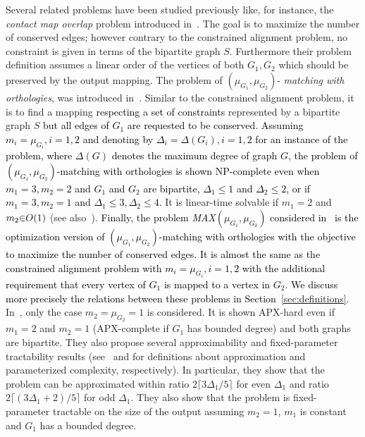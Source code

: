 \documentclass[final]{dmtcs-episciences}
\newcommand\mar[1]{\textcolor{black}{#1}}
\begin{document}
Several related problems have been studied previously like, 
for instance, the {\em contact map overlap} problem introduced in~\citet{Goldman1999}. The goal  is to maximize the number of conserved edges;
however 
contrary to the constrained alignment problem, no constraint is given in terms of the bipartite graph $S$. Furthermore their problem definition assumes a linear order of the vertices of both $G_1, G_2$
which should be preserved by the output mapping. 
The problem 
of $(\mu_{G_1},\mu_{G_2})$-\emph{ matching with orthologies}, was introduced in~\citet{Fagnot2008}. Similar to the constrained alignment problem, it is to find a mapping \mar{respecting a set of constraints} represented by a bipartite graph $S$ \mar{but all edges of $G_1$ are requested to be conserved. 
Assuming $m_i=\mu_{G_i}, i=1,2$ and denoting by  
$\Delta_i=\Delta(G_i), i=1,2$  for an instance of the problem, where $\Delta(G)$ denotes the maximum degree of graph $G$, the problem of $(\mu_{G_1},\mu_{G_2})$-{matching with orthologies} is shown NP-complete 
even when $m_1=3, m_2=2$ and $G_1$ and $G_2$ are bipartite, $\Delta_1\leq 1$ and $\Delta_2\leq 2$, or if $m_1=3, m_2=1$ and $\Delta_1\leq 3, \Delta_2\leq 4$.} It is linear-time solvable if $m_1=2$ and  $m_2\mar{\in}O(1)$ (see also~\citet{Fertin200990}). \mar{Finally,  
 the problem  \emph{ MAX}$(\mu_{G_1},\mu_{G_2})$ considered in~\citet{Fertin200990} is the optimization version of $(\mu_{G_1},\mu_{G_2})$-{matching with orthologies} with the objective to maximize the number of conserved edges. It is almost the same as the constrained alignment problem with $m_i=\mu_{G_i}, i=1,2$ with the additional requirement that every vertex of $G_1$ is  mapped to a vertex in $G_2$. We discuss more precisely the relations between these problems in Section~\ref{sec:definitions}}.  
 In~\citet{Fertin200990},   
 only the case $m_2=\mu_{G_2}=1$ is considered.  
It is shown APX-hard even if $m_1=2$ and $m_2=1$ (APX-complete if $G_1$  has bounded degree) and both graphs are bipartite.  They also propose several approximability and 
fixed-parameter tractability results (see~\citet{ausiellobook} and \citet{ParameterizedComplexity} for definitions about approximation and parameterized complexity, respectively). In particular,
they show that the problem can be approximated within ratio $2\lceil3\Delta_1/5\rceil$
for even $\Delta_1$ and ratio $2\lceil(3\Delta_1+2)/5\rceil$ for odd 
$\Delta_1$. They also show that the problem is fixed-parameter tractable 
on the size of the output assuming $m_2=1$, $m_1$ is constant and $G_1$ has a bounded degree.
\end{document}

